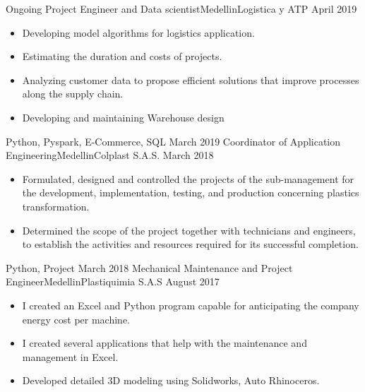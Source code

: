 %
%
%
\begin{experiences}
  \experience
    {Ongoing}  {Project Engineer and Data scientist}{Medellin}{Logistica y ATP}
    {April 2019} {
                      \begin{itemize}
                        \item Developing model algorithms for logistics application.                      
                        \item Estimating the duration and costs of projects.                  
                        \item Analyzing customer data to propose efficient solutions that improve processes along the supply chain.               
                        \item Developing and maintaining Warehouse design                                                                
                      \end{itemize}
                    }
                    {Python, Pyspark, E-Commerce, SQL}
  \emptySeparator
  \experience
    {March 2019} {Coordinator of Application Engineering}{Medellin}{Colplast S.A.S.}
    {March 2018}    {
                      \begin{itemize}
                        \item Formulated, designed and controlled the projects of the sub-management for the development, implementation, testing, and production concerning plastics transformation.                           
                        \item Determined the scope of the project together with technicians and engineers, to establish the activities and resources required for its successful completion.                        
                      \end{itemize}
                    }
                    {Python, Project}
  \emptySeparator
  \experience
    {March 2018}     {Mechanical Maintenance and Project Engineer}{Medellin}{Plastiquimia S.A.S}
    {August 2017}    
                    {
                      \begin{itemize}
                        \item I created an Excel and Python program capable for anticipating the company energy cost per machine.
                        \item I created several applications that help with the maintenance and management in Excel.               
                        \item Developed detailed 3D modeling using Solidworks, Auto Rhinoceros.                  
                                                 

\end{itemize}}
\end{experiences}
